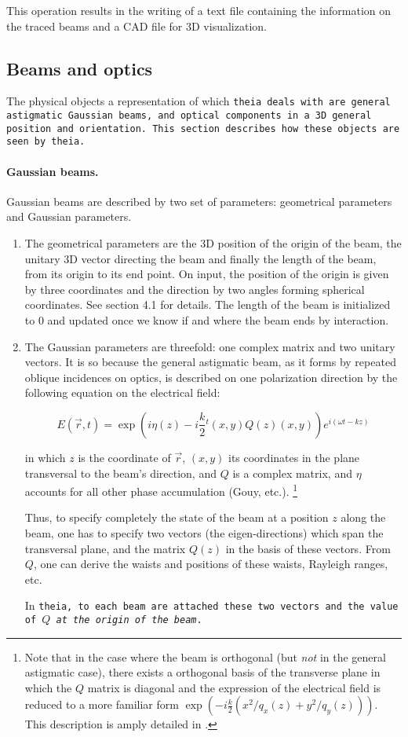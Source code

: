 \documentclass{article}
\begin{document}
This operation results in the writing of a text file containing the information on the traced beams and a CAD file for 3D visualization.

\subsection{Beams and optics}
The physical objects a representation of which \tt{theia} deals with are general astigmatic Gaussian beams, and optical components in a 3D general position and orientation. This section describes how these objects are seen by \tt{theia}.



\paragraph{Gaussian beams.}Gaussian beams are described by two set of parameters: geometrical parameters and Gaussian parameters.

\begin{enumerate}
\item The geometrical parameters are the 3D position of the origin of the beam, the unitary 3D vector directing the beam and finally the length of the beam, from its origin to its end point. On input, the position of the origin is given by three coordinates and the direction by two angles forming spherical coordinates. See section 4.1 for details. The length of the beam is initialized to 0 and updated once we know if and where the beam ends by interaction.

\item The Gaussian parameters are threefold: one complex matrix and two unitary vectors. It is so because the general astigmatic beam, as it forms by repeated oblique incidences on optics, is described on one polarization direction by the following equation on the electrical field:

$$ E(\vec r , t) = \exp(i\eta(z) -i\frac{k}{2} {}^t(x,y)Q(z)(x,y))e^{i(\omega t - kz)} $$

in which $z$ is the coordinate of $\vec r$, $(x,y)$ its coordinates in the plane transversal to the beam's direction, and $Q$ is a complex matrix, and $\eta$ accounts for all other phase accumulation (Gouy, etc.). \footnote{Note that in the case where the beam is orthogonal (but \textit{not} in the general astigmatic case), there exists a orthogonal basis of the transverse plane in which the $Q$ matrix is diagonal and the expression of the electrical field is reduced to a more familiar form $\exp(-i\frac{k}{2} (x^2/q_x(z) + y^2/q_y(z)))$. This description is amply detailed in \cite{1,2}.}

Thus, to specify completely the state of the beam at a position $z$ along the beam, one has to specify two vectors (the eigen-directions) which span the transversal plane, and the matrix $Q(z)$ in the basis of these vectors. From $Q$, one can derive the waists and positions of these waists, Rayleigh ranges, etc.

In \tt{theia}, to each beam are attached these two vectors and the value of $Q$ \textit{at the origin of the beam}.
\end{enumerate}
\end{document}
